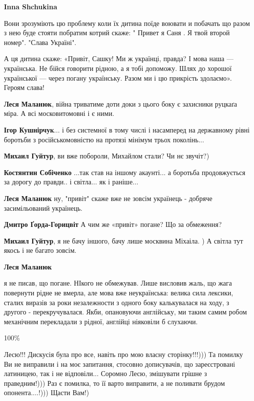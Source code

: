 \begin{itemize}
\textbf{Inna Shchukina} 

Вони зрозуміють цю проблему коли їх дитина поїде воювати и побачать що разом з
нею буде стояти побратим котрий скаже: " Привет я Саня . Я твой второй номер".
"Слава Україні".

\begin{itemize} %
А ця дитина скаже: «Привіт, Сашку! Ми ж українці, правда? І мова наша — українська. Не бійся говорити рідною, а я тобі допоможу. Шлях до хорошої української — через погану українську. Разом ми і цю прикрість здолаємо».
Героям слава!

\textbf{Леся Маланюк}, війна триватиме доти доки з цього боку є захисники руцкаґа міра. А всі московитомовні і є ними.

\textbf{Ігор Кушнірчук}... і без системної в тому числі і насамперед на державному рівні боротьби з російськомовністю на протязі мінімум трьох поколінь...

\textbf{Михаил Гуйтур}, ви вже побороли, Михайлом стали? Чи нє звучіт?)

\textbf{Костянтин Собіченко} ...так став на іншому акаунті... а боротьба продовжується за дорогу до правди.. і світла... як і раніше...

\textbf{Леся Маланюк} ну, "привіт" скаже вже не зовсім українець - добряче засимільований українець.

\textbf{Дмитро Ґорда-Горицвіт} А чим же «привіт» погане? Що за обмеження?

\textbf{Михаил Гуйтур}, я не бачу іншого, бачу лише москвина Міхаіла. ) А світла тут якось і не багато зовсім.

\textbf{Леся Маланюк} 

я не писав, що погане. НІкого не обмежував. Лише висловив жаль, що жага
повернути рідне не вмерла, але мова вже неукраїнська: велика сила лексики,
сталих виразів за роки незалежности з одного боку калькувалася на ходу, з
другого - перекручувалася. Якби, опановуючи англійську, ми таким самим робом
механічним перекладали з рідної, англійці ніяковіли б слухаючи.

\end{itemize} %

100\%

Лесю!!!
Дискусія була про все, навіть про мою власну сторінку!!!)))
Та помилку Ви не виправили і на моє запитання, стосовно дописувачів, що зареєстровані латиницею, так і не відповіли...
Соромно Лесю, змішувати грішне з праведним!)))
Раз є помилка, то її варто виправити, а не поливати брудом опонента....!)))
Щасти Вам!)


\end{itemize}
